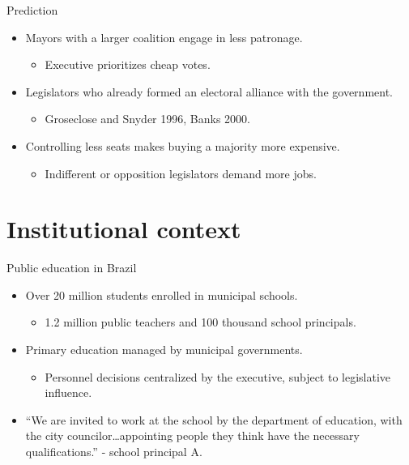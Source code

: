 \documentclass[ignorenonframetext,]{beamer}
\providecommand{\tightlist}{%
  \setlength{\itemsep}{0pt}\setlength{\parskip}{0pt}}
\newcommand{\source}{\footnotesize\textcolor{black!25}}
\begin{document}
\begin{frame}{Prediction}
\protect\hypertarget{prediction}{}

\begin{itemize}
\tightlist
\item
  Mayors with a larger coalition engage in less patronage.

  \begin{itemize}
  \tightlist
  \item
    Executive prioritizes cheap votes.
  \end{itemize}
\item
  Legislators who already formed an electoral alliance with the
  government.

  \begin{itemize}
  \item
    \source{Groseclose and Snyder 1996, Banks 2000.}
  \end{itemize}
\item
  Controlling less seats makes buying a majority more expensive.

  \begin{itemize}
  \tightlist
  \item
    Indifferent or opposition legislators demand more jobs.
  \end{itemize}
\end{itemize}

\end{frame}

\hypertarget{institutional-context}{%
\section{Institutional context}\label{institutional-context}}

\begin{frame}{Public education in Brazil}
\protect\hypertarget{public-education-in-brazil}{}

\begin{itemize}
\tightlist
\item
  Over 20 million students enrolled in municipal schools.

  \begin{itemize}
  \tightlist
  \item
    1.2 million public teachers and 100 thousand school principals.
  \end{itemize}
\item
  Primary education managed by municipal governments.

  \begin{itemize}
  \tightlist
  \item
    Personnel decisions centralized by the executive, subject to
    legislative influence.
  \end{itemize}
\item
  ``We are invited to work at the school by the department of education,
  with the city councilor\ldots{}appointing people they think have the
  necessary qualifications.'' \source{- school principal A.}
\end{itemize}

\end{frame}
\end{document}
